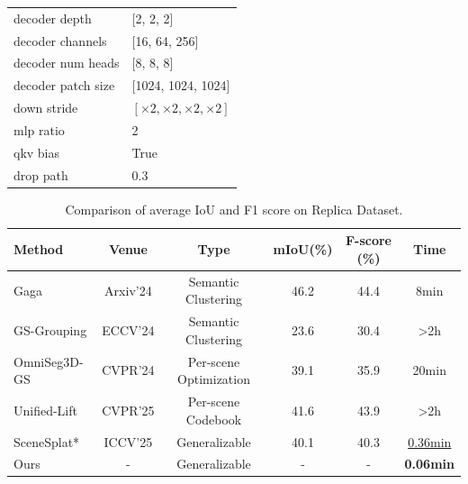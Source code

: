 \begin{table}[tb]
\begin{minipage}[t]{0.48\textwidth}
{\begin{tabular}{l|l}
    decoder depth & [2, 2, 2] \\
    decoder channels & [16, 64, 256] \\
    decoder num heads & [8, 8, 8] \\
    decoder patch size & [1024, 1024, 1024] \\
    down stride & $[\times 2, \times 2, \times 2, \times 2]$ \\
    mlp ratio & 2 \\
    qkv bias & True \\
    drop path & 0.3 \\
    \bottomrule
    \end{tabular}}
    \end{minipage}
\end{table}

\iffalse
\begin{table}[tb]
\caption{Comparison of average IoU and F1 score on Replica Dataset.}
\begin{center}
\begin{tabular}{l|c|c|cc|c}
\toprule
Method & Venue & Type & mIoU(\%) & F-score (\%) & Time \\
\midrule
Gaga \cite{lyu2024gaga} & Arxiv'24 & Semantic Clustering & 46.2 & 44.4 & 8min\\ %
GS-Grouping \cite{ye2024gaussian} & ECCV'24 & Semantic Clustering & 23.6 & 30.4 & >2h\\
OmniSeg3D-GS \cite{ying2023omniseg3d} & CVPR'24 & Per-scene Optimization & 39.1 & 35.9 & 20min\\ %
Unified-Lift \cite{zhu2025rethinking}& CVPR'25 & Per-scene Codebook & 41.6 & 43.9 & >2h\\

\midrule
SceneSplat* \cite{li2025scenesplat}& ICCV'25 & Generalizable & 40.1 & 40.3 & \underline{0.36min}\\
Ours & - & Generalizable & - & - & \textbf{0.06min}\\
\bottomrule
\end{tabular}
\label{tab: LERF}
\end{center}
\end{table}

